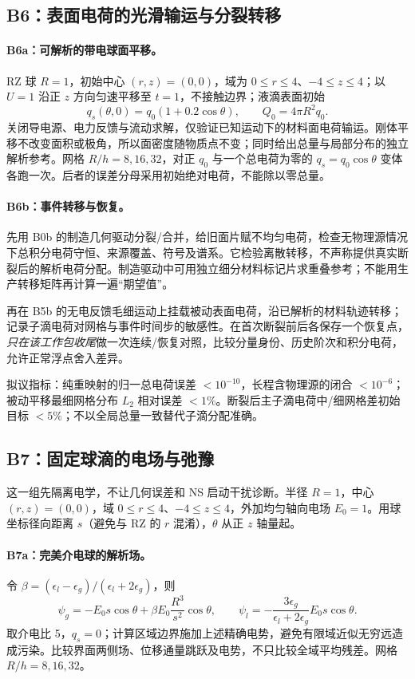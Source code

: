 \documentclass[11pt,a4paper]{article}
\begin{document}
\subsection{B6：表面电荷的光滑输运与分裂转移}
\paragraph{B6a：可解析的带电球面平移。}
RZ 球 $R=1$，初始中心 $(r,z)=(0,0)$，域为 $0\leq r\leq4$、$-4\leq z\leq4$；以 $U=1$ 沿正 $z$ 方向匀速平移至 $t=1$，不接触边界；液滴表面初始
\begin{equation}
q_s(\theta,0)=q_0(1+0.2\cos\theta),\qquad Q_0=4\pi R^2q_0.
\end{equation}
关闭导电源、电力反馈与流动求解，仅验证已知运动下的材料面电荷输运。刚体平移不改变面积或极角，所以面密度随物质点不变；同时给出总量与局部分布的独立解析参考。网格 $R/h=8,16,32$，对正 $q_0$ 与一个总电荷为零的 $q_s=q_0\cos\theta$ 变体各跑一次。后者的误差分母采用初始绝对电荷，不能除以零总量。

\paragraph{B6b：事件转移与恢复。}
先用 B0b 的制造几何驱动分裂/合并，给旧面片赋不均匀电荷，检查无物理源情况下总积分电荷守恒、来源覆盖、符号及谱系。它检验离散转移，不声称提供真实断裂后的解析电荷分配。制造驱动中可用独立细分材料标记片求重叠参考；不能用生产转移矩阵再计算一遍“期望值”。

再在 B5b 的无电反馈毛细运动上挂载被动表面电荷，沿已解析的材料轨迹转移；记录子滴电荷对网格与事件时间步的敏感性。在首次断裂前后各保存一个恢复点，\emph{只在该工作包收尾}做一次连续/恢复对照，比较分量身份、历史阶次和积分电荷，允许正常浮点舍入差异。

拟议指标：纯重映射的归一总电荷误差 $<10^{-10}$，长程含物理源的闭合 $<10^{-6}$；被动平移最细网格分布 $L_2$ 相对误差 $<1\%$。断裂后主子滴电荷中/细网格差初始目标 $<5\%$；不以全局总量一致替代子滴分配准确。

\subsection{B7：固定球滴的电场与弛豫}
这一组先隔离电学，不让几何误差和 NS 启动干扰诊断。半径 $R=1$，中心 $(r,z)=(0,0)$，域 $0\leq r\leq4$、$-4\leq z\leq4$，外加均匀轴向电场 $E_0=1$。用球坐标径向距离 $s$（避免与 RZ 的 $r$ 混淆），$\theta$ 从正 $z$ 轴量起。

\paragraph{B7a：完美介电球的解析场。}
令 $\beta=(\epsilon_l-\epsilon_g)/(\epsilon_l+2\epsilon_g)$，则
\begin{equation}
\psi_g=-E_0s\cos\theta+\beta E_0\frac{R^3}{s^2}\cos\theta,
\qquad
\psi_l=-\frac{3\epsilon_g}{\epsilon_l+2\epsilon_g}E_0s\cos\theta.
\end{equation}
取介电比 5，$q_s=0$；计算区域边界施加上述精确电势，避免有限域近似无穷远造成污染。比较界面两侧场、位移通量跳跃及电势，不只比较全域平均残差。网格 $R/h=8,16,32$。
\end{document}

